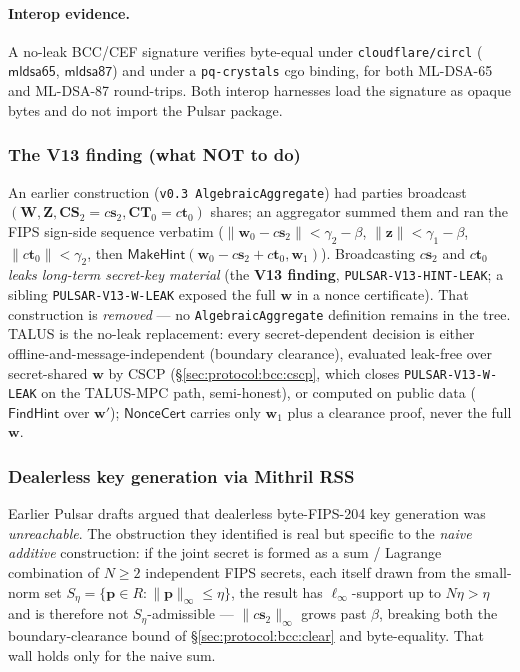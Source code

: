 \paragraph{Interop evidence.} A no-leak BCC/CEF signature verifies
byte-equal under \texttt{cloudflare/circl} ($\mathsf{mldsa65}$,
$\mathsf{mldsa87}$) and under a \texttt{pq-crystals} cgo binding, for
both ML-DSA-65 and ML-DSA-87 round-trips. Both interop harnesses load the
signature as opaque bytes and do not import the Pulsar package.

\subsubsection{The V13 finding (what NOT to do)}
\label{sec:protocol:bcc:v13}

An earlier construction (\texttt{v0.3 AlgebraicAggregate}) had parties
broadcast $(\mathbf{W}, \mathbf{Z}, \mathbf{C}\mathbf{S}_2 = c\mathbf{s}_2,
\mathbf{C}\mathbf{T}_0 = c\mathbf{t}_0)$ shares; an aggregator summed
them and ran the FIPS sign-side sequence verbatim ($\|\mathbf{w}_0 -
c\mathbf{s}_2\| < \gamma_2 - \beta$, $\|\mathbf{z}\| < \gamma_1 - \beta$,
$\|c\mathbf{t}_0\| < \gamma_2$, then $\mathsf{MakeHint}(\mathbf{w}_0 -
c\mathbf{s}_2 + c\mathbf{t}_0, \mathbf{w}_1)$). Broadcasting
$c\mathbf{s}_2$ and $c\mathbf{t}_0$ \emph{leaks long-term secret-key
material} (the \textbf{V13 finding}, \texttt{PULSAR-V13-HINT-LEAK}; a
sibling \texttt{PULSAR-V13-W-LEAK} exposed the full $\mathbf{w}$ in a
nonce certificate). That construction is \emph{removed} --- no
\texttt{AlgebraicAggregate} definition remains in the tree. TALUS is the
no-leak replacement: every secret-dependent decision is either
offline-and-message-independent (boundary clearance), evaluated leak-free
over secret-shared $\mathbf{w}$ by CSCP (\S\ref{sec:protocol:bcc:cscp},
which closes \texttt{PULSAR-V13-W-LEAK} on the TALUS-MPC path,
semi-honest), or computed on public data ($\mathsf{FindHint}$ over
$\mathbf{w}'$); $\mathsf{NonceCert}$ carries only $\mathbf{w}_1$ plus a
clearance proof, never the full $\mathbf{w}$.

\subsubsection{Dealerless key generation via Mithril RSS}
\label{sec:protocol:bcc:keydkg}

Earlier Pulsar drafts argued that dealerless byte-FIPS-204 key generation
was \emph{unreachable}. The obstruction they identified is real but
specific to the \emph{naive additive} construction: if the joint secret
is formed as a sum / Lagrange combination of $N \geq 2$ independent FIPS
secrets, each itself drawn from the small-norm set $S_\eta = \{\mathbf{p}
\in R : \|\mathbf{p}\|_\infty \leq \eta\}$, the result has
$\ell_\infty$-support up to $N\eta > \eta$ and is therefore not
$S_\eta$-admissible --- $\|c\mathbf{s}_2\|_\infty$ grows past $\beta$,
breaking both the boundary-clearance bound of
\S\ref{sec:protocol:bcc:clear} and byte-equality. That wall holds only
for the naive sum.

